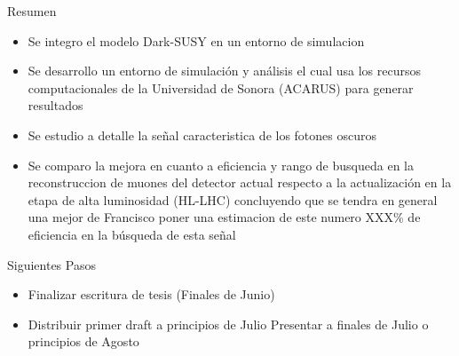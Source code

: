 \begin{frame}{Resumen}
\begin{itemize}
    \item Se integro el modelo Dark-SUSY en un entorno de simulacion
    \item Se desarrollo un entorno de simulaci\'on y an\'alisis el cual usa los recursos computacionales de la Universidad de Sonora (ACARUS) para generar resultados 
    \item Se estudio a detalle la se\~nal caracteristica de los fotones oscuros
    \item Se comparo la mejora en cuanto a eficiencia y rango de busqueda en la reconstruccion de muones del detector actual respecto a la actualizaci\'on en la etapa de alta luminosidad (HL-LHC) concluyendo que se tendra en general una mejor de \color{red} Francisco poner una estimacion de este numero XXX\% \color{black} de eficiencia en la b\'usqueda de esta se\~nal
\end{itemize}
    
\end{frame}


\begin{frame}{Siguientes Pasos}
\begin{itemize}
    \item Finalizar escritura de tesis (Finales de Junio) 
    \item Distribuir primer draft a  principios de Julio
    \tiem Presentar a finales de Julio o principios de Agosto
\end{itemize}
    
\end{frame}